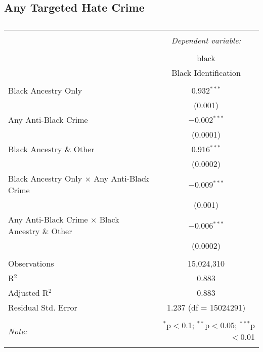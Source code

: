 \documentclass{article}
\begin{document}
\subsection{Any Targeted Hate Crime}
    \begin{table}[!htbp] \centering 
      \caption{} 
      \label{} 
    \begin{tabular}{@{\extracolsep{5pt}}lc} 
    \\[-1.8ex]\hline 
    \hline \\[-1.8ex] 
     & \multicolumn{1}{c}{\textit{Dependent variable:}} \\ 
    \cline{2-2} 
    \\[-1.8ex] & black \\ 
     & Black Identification \\ 
    \hline \\[-1.8ex] 
     Black Ancestry Only & 0.932$^{***}$ \\ 
      & (0.001) \\ 
     Any Anti-Black Crime  & $-$0.002$^{***}$ \\ 
      & (0.0001) \\ 
     Black Ancestry \& Other & 0.916$^{***}$ \\ 
      & (0.0002) \\ 
     Black Ancestry Only $\times$ Any Anti-Black Crime  & $-$0.009$^{***}$ \\ 
      & (0.001) \\ 
     Any Anti-Black Crime $\times$ Black Ancestry \& Other & $-$0.006$^{***}$ \\ 
      & (0.0002) \\ 
    \hline \\[-1.8ex] 
    Observations & 15,024,310 \\ 
    R$^{2}$ & 0.883 \\ 
    Adjusted R$^{2}$ & 0.883 \\ 
    Residual Std. Error & 1.237 (df = 15024291) \\ 
    \hline 
    \hline \\[-1.8ex] 
    \textit{Note:}  & \multicolumn{1}{r}{$^{*}$p$<$0.1; $^{**}$p$<$0.05; $^{***}$p$<$0.01} \\ 
    \label{tab:black_lag}
    \end{tabular} 
    \end{table} 
\end{document}
